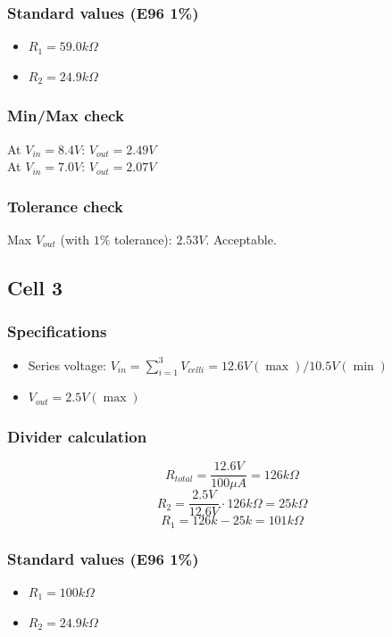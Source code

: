 \documentclass{article}
\begin{document}
\subsubsection{Standard values (E96 1\%)}
\begin{itemize}
\item $R_1 = 59.0k\Omega$
\item $R_2 = 24.9k\Omega$
\end{itemize}

\subsubsection{Min/Max check}
At $V_{in} = 8.4V$: $V_{out} = 2.49V$ \\
At $V_{in} = 7.0V$: $V_{out} = 2.07V$

\subsubsection{Tolerance check}
Max $V_{out}$ (with $1\%$ tolerance): $2.53V$. Acceptable.

\subsection{Cell 3}
\subsubsection{Specifications}
\begin{itemize}
\item Series voltage: $V_{in} = \sum_{i=1}^{3} V_{celli} = 12.6V (\max) / 10.5V (\min)$
\item $V_{out} = 2.5V (\max)$
\end{itemize}

\subsubsection{Divider calculation}
$$R_{total} = \frac{12.6V}{100\mu A} = 126k\Omega$$
$$R_2 = \frac{2.5V}{12.6V} \cdot 126k\Omega = 25k\Omega$$
$$R_1 = 126k - 25k = 101k\Omega$$

\subsubsection{Standard values (E96 1\%)}
\begin{itemize}
\item $R_1 = 100k\Omega$
\item $R_2 = 24.9k\Omega$
\end{itemize}
\end{document}
